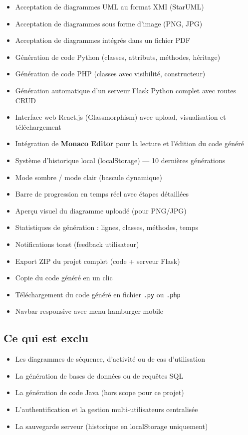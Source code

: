 \documentclass[12pt,a4paper]{article}
\begin{document}
\begin{itemize}[leftmargin=1.5em]
  \item Acceptation de diagrammes UML au format XMI (StarUML)
  \item Acceptation de diagrammes sous forme d'image (PNG, JPG)
  \item Acceptation de diagrammes intégrés dans un fichier PDF
  \item Génération de code Python (classes, attributs, méthodes, héritage)
  \item Génération de code PHP (classes avec visibilité, constructeur)
  \item Génération automatique d'un serveur Flask Python complet avec routes CRUD
  \item Interface web React.js (Glassmorphism) avec upload, visualisation et téléchargement
  \item Intégration de \textbf{Monaco Editor} pour la lecture et l'édition du code généré
  \item Système d'historique local (localStorage) — 10 dernières générations
  \item Mode sombre / mode clair (bascule dynamique)
  \item Barre de progression en temps réel avec étapes détaillées
  \item Aperçu visuel du diagramme uploadé (pour PNG/JPG)
  \item Statistiques de génération : lignes, classes, méthodes, temps
  \item Notifications toast (feedback utilisateur)
  \item Export ZIP du projet complet (code + serveur Flask)
  \item Copie du code généré en un clic
  \item Téléchargement du code généré en fichier \texttt{.py} ou \texttt{.php}
  \item Navbar responsive avec menu hamburger mobile
\end{itemize}

\subsection{Ce qui est exclu}

\begin{itemize}[leftmargin=1.5em]
  \item Les diagrammes de séquence, d'activité ou de cas d'utilisation
  \item La génération de bases de données ou de requêtes SQL
  \item La génération de code Java (hors scope pour ce projet)
  \item L'authentification et la gestion multi-utilisateurs centralisée
  \item La sauvegarde serveur (historique en localStorage uniquement)
\end{itemize}
\end{document}
